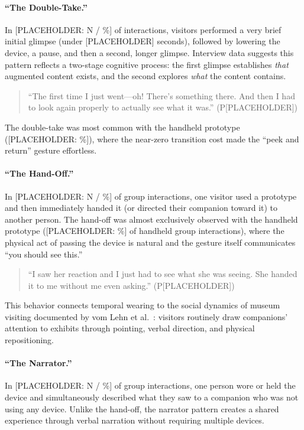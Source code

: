 \paragraph{``The Double-Take.''}
In [PLACEHOLDER: N / \%] of interactions, visitors performed a very brief initial glimpse (under [PLACEHOLDER] seconds), followed by lowering the device, a pause, and then a second, longer glimpse. Interview data suggests this pattern reflects a two-stage cognitive process: the first glimpse establishes \textit{that} augmented content exists, and the second explores \textit{what} the content contains.

\begin{quote}
``The first time I just went---oh! There's something there. And then I had to look again properly to actually see what it was.'' (P[PLACEHOLDER])
\end{quote}

The double-take was most common with the handheld prototype ([PLACEHOLDER: \%]), where the near-zero transition cost made the ``peek and return'' gesture effortless.

\paragraph{``The Hand-Off.''}
In [PLACEHOLDER: N / \%] of group interactions, one visitor used a prototype and then immediately handed it (or directed their companion toward it) to another person. The hand-off was almost exclusively observed with the handheld prototype ([PLACEHOLDER: \%] of handheld group interactions), where the physical act of passing the device is natural and the gesture itself communicates ``you should see this.''

\begin{quote}
``I saw her reaction and I just had to see what she was seeing. She handed it to me without me even asking.'' (P[PLACEHOLDER])
\end{quote}

This behavior connects temporal wearing to the social dynamics of museum visiting documented by vom Lehn et al.~\cite{vomlehn2001exhibiting}: visitors routinely draw companions' attention to exhibits through pointing, verbal direction, and physical repositioning.

\paragraph{``The Narrator.''}
In [PLACEHOLDER: N / \%] of group interactions, one person wore or held the device and simultaneously described what they saw to a companion who was not using any device. Unlike the hand-off, the narrator pattern creates a shared experience through verbal narration without requiring multiple devices.

